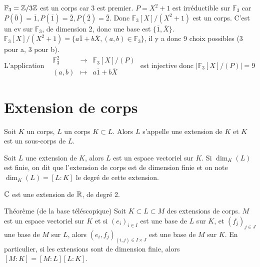 \documentclass[]{report}
\begin{document}
    \begin{ex}{}{}
        $\mathbb{F}_3=\mathbb{Z}/3\mathbb{Z}$ est un corps car 3 est premier. $P=X^2+1$ est irréductible sur $\mathbb{F}_3$ car $P(\overline{0})=\overline{1},P(\overline{1})=\overline{2},P(\overline{2})=\overline{2}$. Donc $\mathbb{F}_3[X]/(X^2+1)$ est un corps. C'est un ev sur $\mathbb{F}_3$, de dimension 2, donc une base est $\{\overline{1},\overline{X}\}$. $\mathbb{F}_3[X]/(X^2+1)=\{a\overline{1}+b\overline{X},(a,b)\in \mathbb{F}_3\}$, il y a donc 9 choix possibles (3 pour a, 3 pour b).\\
        L'application$\begin{array}{ccccc}
    & \mathbb{F}_3^2 & \to & \mathbb{F}_3[X]/(P) \\
      & (a,b) & \mapsto & a\overline{1}+b\overline{X}
    \end{array}$ est injective donc $|\mathbb{F}_3[X]/(P)|=9$
    \end{ex}

    \section{Extension de corps}

    \begin{df}{}{}
        Soit $K$ un corps, $L$ un corps \tq $K\subset L$. Alors $L$ s'appelle une extension de $K$ et $K$ est un sous-corps de $L$.
    \end{df}

    \begin{df}{}{}
        Soit $L$ une extension de $K$, alors $L$ est un espace vectoriel sur $K$. Si $\dim_K (L)$ est finie, on dit que l'extension de corps est de dimension finie et on note $\dim_K (L)=[L:K]$ le degré de cette extension.
    \end{df}

    \begin{ex}{}{}
        $\mathbb{C}$ est une extension de $\mathbb{R}$, de degré 2.
    \end{ex}

    \begin{tm}{Théorème (de la base téléscopique)}{}
        Soit $K\subset L\subset M$ des extensions de corps. $M$ est un espace vectoriel sur $K$ et si $(e_i)_{i\in I}$ est une base de $L$ sur $K$, et $(f_j)_{j\in J}$ une base de $M$ sur $L$, alors $(e_i,f_j)_{(i,j)\in I\times J}$ est une base de $M$ sur $K$. En particulier, si les extensions sont de dimension finie, alors $[M:K]=[M:L][L:K]$.
    \end{tm}
\end{document}
